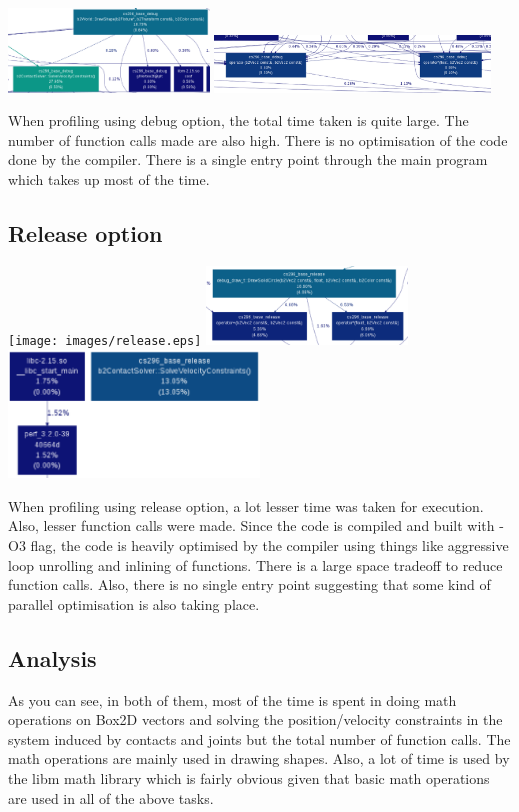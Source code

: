 \documentclass[a4paper,11pt]{article}
\begin{document}
\includegraphics[width=0.4\textwidth]{images/debug3.eps}
\includegraphics[width=0.55\textwidth]{images/debug2.eps}


When profiling using debug option, the total time taken is quite large. The number of function calls made are also high. There is no optimisation of the code done by the compiler. There is a single entry point through the main program which takes up most of the time.\\

\subsection{Release option}
\texttt{[image: images/release.eps]}
\includegraphics[width=0.4\textwidth]{images/release1.eps}
\includegraphics[width=0.5\textwidth]{images/release2.eps}


When profiling using release option, a lot lesser time was taken for execution. Also, lesser function calls were made. Since the code is compiled and built with -O3 flag, the code is heavily optimised by the compiler using things like aggressive loop unrolling and inlining of functions. There is a large space tradeoff to reduce function calls. Also, there is no single entry point suggesting that some kind of parallel optimisation is also taking place.

\subsection{Analysis}
As you can see, in both of them, most of the time is spent in doing math operations on Box2D vectors and solving the position/velocity constraints in the system induced by contacts and joints but the total number of function calls. The math operations are mainly used in drawing shapes.
Also, a lot of time is used by the libm math library which is fairly obvious given that basic math operations are used in all of the above tasks.
\end{document}
